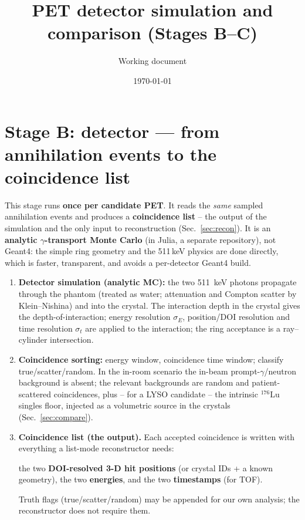 \documentclass[11pt]{article}
\title{PET detector simulation and comparison (Stages B--C)}
\author{Working document}
\date{\today}
\begin{document}
\maketitle


\section{Stage B: detector --- from annihilation events to the coincidence list}
\label{sec:detector}

This stage runs \textbf{once per candidate PET}. It reads the \emph{same} sampled
annihilation events and produces a \textbf{coincidence list} -- the output of the
simulation and the only input to reconstruction (Sec.~\ref{sec:recon}). It is an
\textbf{analytic $\gamma$-transport Monte Carlo} (in Julia, a separate
repository), not Geant4: the simple ring geometry and the 511\,keV physics are
done directly, which is faster, transparent, and avoids a per-detector Geant4
build.
\begin{enumerate}[nosep]
\item \textbf{Detector simulation (analytic MC):} the two \SI{511}{keV} photons
propagate through the phantom (treated as water; attenuation and Compton scatter
by Klein--Nishina) and into the crystal. The interaction depth in the crystal
gives the depth-of-interaction; energy resolution $\sigma_E$, position/DOI
resolution and time resolution $\sigma_t$ are applied to the interaction; the
ring acceptance is a ray--cylinder intersection.
\item \textbf{Coincidence sorting:} energy window, coincidence time window;
classify true/scatter/random. In the in-room scenario the in-beam
prompt-$\gamma$/neutron background is absent; the relevant backgrounds are random
and patient-scattered coincidences, plus -- for a LYSO candidate -- the intrinsic
${}^{176}\mathrm{Lu}$ singles floor, injected as a volumetric source in the
crystals (Sec.~\ref{sec:compare}).
\item \textbf{Coincidence list (the output).} Each accepted coincidence is written
with everything a list-mode reconstructor needs:
\begin{center}
the two \textbf{DOI-resolved 3-D hit positions} (or crystal IDs + a known geometry),
the two \textbf{energies}, and the two \textbf{timestamps} (for TOF).
\end{center}
Truth flags (true/scatter/random) may be appended for our own analysis; the
reconstructor does not require them.
\end{enumerate}
\end{document}
